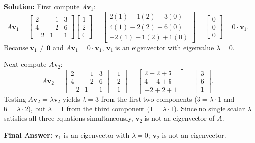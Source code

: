 \documentclass[11pt, letterpaper]{article}
\theoremstyle{definition}
\theoremstyle{remark}
\begin{document}
\textbf{Solution:}
First compute $A\mathbf{v}_1$:
\[
A\mathbf{v}_1 = \begin{bmatrix} 2 & -1 & 3 \\ 4 & -2 & 6 \\ -2 & 1 & 1 \end{bmatrix}\begin{bmatrix} 1 \\ 2 \\ 0 \end{bmatrix} = \begin{bmatrix} 2(1) - 1(2) + 3(0) \\ 4(1) - 2(2) + 6(0) \\ -2(1) + 1(2) + 1(0) \end{bmatrix} = \begin{bmatrix} 0 \\ 0 \\ 0 \end{bmatrix} = 0 \cdot \mathbf{v}_1.
\]
Because $\mathbf{v}_1 \neq \mathbf{0}$ and $A\mathbf{v}_1 = 0 \cdot \mathbf{v}_1$, $\mathbf{v}_1$ is an eigenvector with eigenvalue $\lambda = 0$.

Next compute $A\mathbf{v}_2$:
\[
A\mathbf{v}_2 = \begin{bmatrix} 2 & -1 & 3 \\ 4 & -2 & 6 \\ -2 & 1 & 1 \end{bmatrix}\begin{bmatrix} 1 \\ 2 \\ 1 \end{bmatrix} = \begin{bmatrix} 2 - 2 + 3 \\ 4 - 4 + 6 \\ -2 + 2 + 1 \end{bmatrix} = \begin{bmatrix} 3 \\ 6 \\ 1 \end{bmatrix}.
\]
Testing $A\mathbf{v}_2 = \lambda\mathbf{v}_2$ yields $\lambda = 3$ from the first two components ($3 = \lambda\cdot 1$ and $6 = \lambda\cdot 2$), but $\lambda = 1$ from the third component ($1 = \lambda\cdot 1$). Since no single scalar $\lambda$ satisfies all three equations simultaneously, $\mathbf{v}_2$ is not an eigenvector of $A$.

\textbf{Final Answer:} $\mathbf{v}_1$ is an eigenvector with $\lambda = 0$; $\mathbf{v}_2$ is not an eigenvector.
\end{document}
